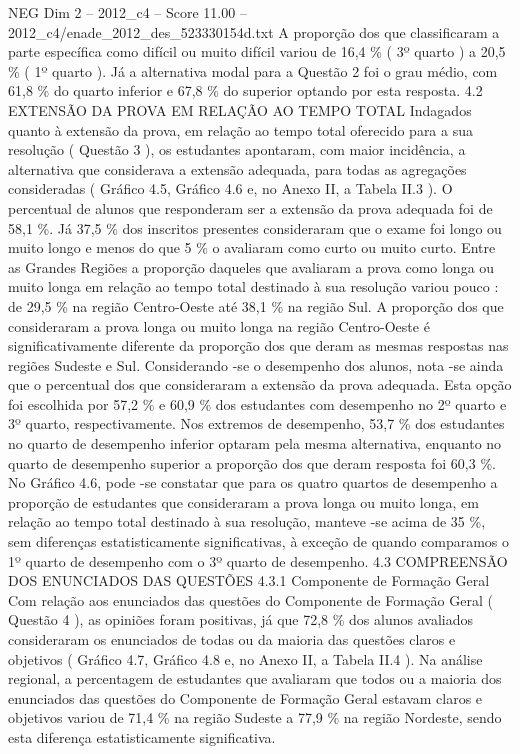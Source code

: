\begin{textsample}{NEG Dim 2 – 2012\_c4 – Score 11.00 – 2012\_c4/enade\_2012\_des\_523330154d.txt}
A proporção dos que classificaram a parte específica como difícil ou muito difícil variou de 16,4 \% ( 3º quarto ) a 20,5 \% ( 1º quarto ).
Já a alternativa modal para a Questão 2 foi o grau médio, com 61,8 \% do quarto inferior e 67,8 \% do superior optando por esta resposta. 4.2 EXTENSÃO DA PROVA EM RELAÇÃO AO TEMPO TOTAL Indagados quanto à extensão da prova, em relação ao tempo total oferecido para a sua resolução ( Questão 3 ), os estudantes apontaram, com maior incidência, a alternativa que considerava a extensão adequada, para todas as agregações consideradas ( Gráfico 4.5, Gráfico 4.6 e, no Anexo II, a Tabela II.3 ).
O percentual de alunos que responderam ser a extensão da prova adequada foi de 58,1 \%.
Já 37,5 \% dos inscritos presentes consideraram que o exame foi longo ou muito longo e menos do que 5 \% o avaliaram como curto ou muito curto.
Entre as Grandes Regiões a proporção daqueles que avaliaram a prova como longa ou muito longa em relação ao tempo total destinado à sua resolução variou pouco : de 29,5 \% na região Centro-Oeste até 38,1 \% na região Sul.
A proporção dos que consideraram a prova longa ou muito longa na região Centro-Oeste é significativamente diferente da proporção dos que deram as mesmas respostas nas regiões Sudeste e Sul.
Considerando -se o desempenho dos alunos, nota -se ainda que o percentual dos que consideraram a extensão da prova adequada.
Esta opção foi escolhida por 57,2 \% e 60,9 \% dos estudantes com desempenho no 2º quarto e 3º quarto, respectivamente.
Nos extremos de desempenho, 53,7 \% dos estudantes no quarto de desempenho inferior optaram pela mesma alternativa, enquanto no quarto de desempenho superior a proporção dos que deram resposta foi 60,3 \%.
No Gráfico 4.6, pode -se constatar que para os quatro quartos de desempenho a proporção de estudantes que consideraram a prova longa ou muito longa, em relação ao tempo total destinado à sua resolução, manteve -se acima de 35 \%, sem diferenças estatisticamente significativas, à exceção de quando comparamos o 1º quarto de desempenho com o 3º quarto de desempenho. 4.3 COMPREENSÃO DOS ENUNCIADOS DAS QUESTÕES 4.3.1 Componente de Formação Geral Com relação aos enunciados das questões do Componente de Formação Geral ( Questão 4 ), as opiniões foram positivas, já que 72,8 \% dos alunos avaliados consideraram os enunciados de todas ou da maioria das questões claros e objetivos ( Gráfico 4.7, Gráfico 4.8 e, no Anexo II, a Tabela II.4 ).
Na análise regional, a percentagem de estudantes que avaliaram que todos ou a maioria dos enunciados das questões do Componente de Formação Geral estavam claros e objetivos variou de 71,4 \% na região Sudeste a 77,9 \% na região Nordeste, sendo esta diferença estatisticamente significativa.

\end{textsample}
